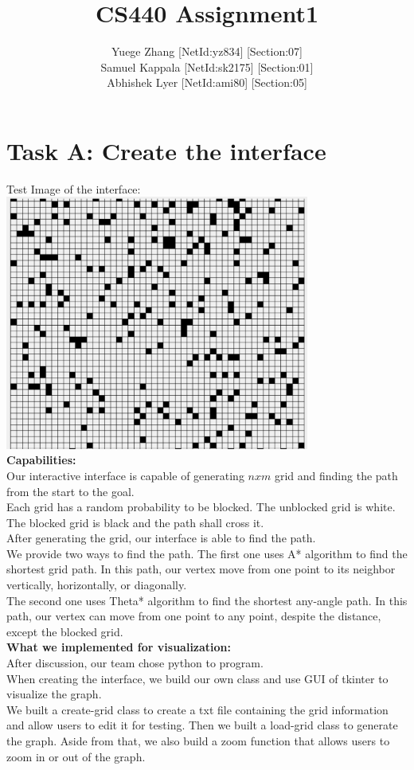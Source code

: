 \documentclass[12pt, letterpaper]{article}
\title{CS440 Assignment1}
\author{Yuege Zhang [NetId:yz834] [Section:07]\\Samuel Kappala [NetId:sk2175] [Section:01] \\Abhishek Lyer [NetId:ami80] [Section:05]}
\date{}
\begin{document}
\maketitle

\section{Task A: Create the interface}
Test Image of the interface:\\
\includegraphics[width=10cm]{1a-gridtest}\\
\textbf{Capabilities:}\\
Our interactive interface is capable of generating $nxm$ grid and finding the path from the start to the goal.\\
Each grid has a random probability to be blocked. The unblocked grid is white. The blocked grid is black and the path shall cross it.\\
After generating the grid, our interface is able to find the path.\\
We provide two ways to find the path. The first one uses A* algorithm to find the shortest grid path. In this path, our vertex move from one point to its neighbor vertically, horizontally, or diagonally.\\
The second one uses Theta* algorithm to find the shortest any-angle path. In this path, our vertex can move from one point to any point, despite the distance, except the blocked grid.\\
\textbf{What we implemented for visualization:}\\
After discussion, our team chose python to program.\\
When creating the interface, we build our own class and use GUI of tkinter to visualize the graph.\\
We built a create-grid class to create a txt file containing the grid information and allow users to edit it for testing. Then we built a load-grid class to generate the graph. Aside from that, we also build a zoom function that allows users to zoom in or out of the graph.\\
\end{document}
